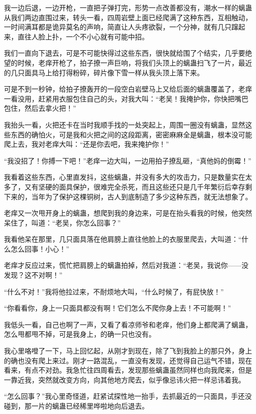 我一边后退，一边开枪，一直把子弹打完，形势一点改善都没有，潮水一样的螭蛊从我们两边直围过来，转头一看，四周岩壁上面已经爬满了这种东西，互相触动，一时间满耳都是诡异莫名的声响，简直让人头疼欲裂，一个分神，就有几只蹿起来，直往人脸上扑，一个不小心就有可能中招。

我们一直向下退去，可是不可能快得过这些东西，很快就给围了个结实，几乎要绝望的时候，老痒开枪了，拍子撩一声巨响，将我们头顶上的螭蛊扫飞了一片，最近的几只面具马上给打得粉碎，碎片像下雪一样从我头顶上落下来。

可是不到一秒钟，给拍子撩轰开的一段空白岩壁马上又给后面的螭蛊覆盖了，老痒一看没用，赶紧用衣服包住自己的头，对我大叫：“老吴！我掩护你，你快把嘴巴包住，然后去拿火把！”

我抬头一看，火把还卡在当时我顺手找的一处突起上，周围一圈没有螭蛊，显然这些东西的确怕火，可是我和火把之间的这段距离，密密麻麻全是螭蛊，根本没可能爬上去，我对老痒大叫：“还是你去吧，我来掩护你！”

“我没招了！你搏一下吧！”老痒一边大叫，一边用拍子撩乱砸，“真他妈的倒霉！”

我看着这些东西，心里直发抖，这些螭蛊，并没有多大的攻击力，只是数量实在太多了，又有坚硬的面具保护，很难完全杀死，而且这些还只是几千年繁衍后幸存剩下来的，当年为了保护这棵铜树，古人到底制造了多少这种东西，就无法想象了。

老痒又一次甩开身上的螭蛊，想爬到我的身边来，可是在抬头看我的时候，他突然呆住了，叫道：“老吴，你怎么回事？”

我看他呆在那里，几只面具落在他肩膀上直往他脸上的衣服里爬去，大叫道：“什么怎么回事！小心！”

老痒才反应过来，慌忙把肩膀上的螭蛊拍掉，然后对我道：“老吴，我说你——没发现？这不对啊！”

“什么不对！”我将他拉过来，不耐烦地大叫，“什么时候了，有屁快放！”

“你看看你，身上一只面具都没有啊！它们怎么不爬你身上去！不可能啊！”

我低头一看，自己也啊了一声，又看了看凉师爷和老痒，他们身上都爬满了螭蛊，怎么甩都甩不掉，可是我身上，的确一只也没有。

我心里咯噔了一下，马上回忆起，从刚才到现在，除了飞到我脸上的那只外，身上的确也没有爬上来过。刚才一路混乱，一直没有发现，还觉得自己运气不错，现在看来，有点不对劲。我急忙往四周看去，发现那些螭蛊虽然同样也向我爬来，但是一靠近我，突然就改变方向，向其他地方爬去，似乎像忌讳火把一样忌讳着我。

“怎么回事？”我心里奇怪道，赶紧试探性地一抬手，去抓最近的一只面具，手还没碰到，那一片的螭蛊已经稀里哗啦地向后退去。

